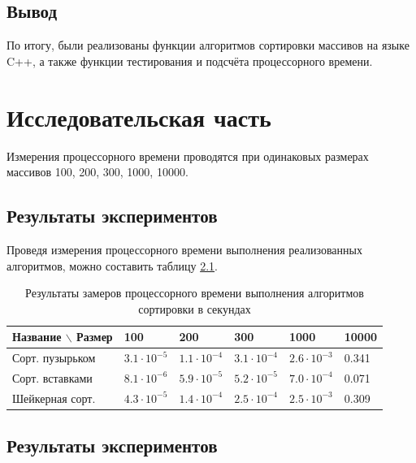 \documentclass[12pt,a4paper]{report}
\begin{document}
\section{Вывод}

По итогу, были реализованы функции алгоритмов сортировки массивов на языке C++, а также функции тестирования и подсчёта 
процессорного времени.

\newpage
\chapter{Исследовательская часть}

Измерения процессорного времени проводятся при одинаковых размерах массивов 100, 200, 300, 1000, 10000.

\section{Результаты экспериментов}

Проведя измерения процессорного времени выполнения реализованных алгоритмов, можно составить таблицу \ref{tabular:timesandtenses}.

\begin{table}[h]
\caption{Результаты замеров процессорного времени выполнения алгоритмов сортировки в секундах}
\label{tabular:timesandtenses}
\begin{center}
\begin{tabular}{ | l | l | l | l | l | l | }
\hline
    Название $\backslash$ Размер & 100                 & 200                 & 300                 & 1000                & 10000 \\ \hline
    Сорт. пузырьком              & $3.1 \cdot 10^{-5}$ & $1.1 \cdot 10^{-4}$ & $3.1 \cdot 10^{-4}$ & $2.6 \cdot 10^{-3}$ & 0.341 \\ \hline
    Сорт. вставками              & $8.1 \cdot 10^{-6}$ & $5.9 \cdot 10^{-5}$ & $5.2 \cdot 10^{-5}$ & $7.0 \cdot 10^{-4}$ & 0.071 \\ \hline
    Шейкерная сорт.              & $4.3 \cdot 10^{-5}$ & $1.4 \cdot 10^{-4}$ & $2.5 \cdot 10^{-4}$ & $2.5 \cdot 10^{-3}$ & 0.309 \\ \hline
\end{tabular}
\end{center}
\end{table}

\section{Результаты экспериментов}
\end{document}
